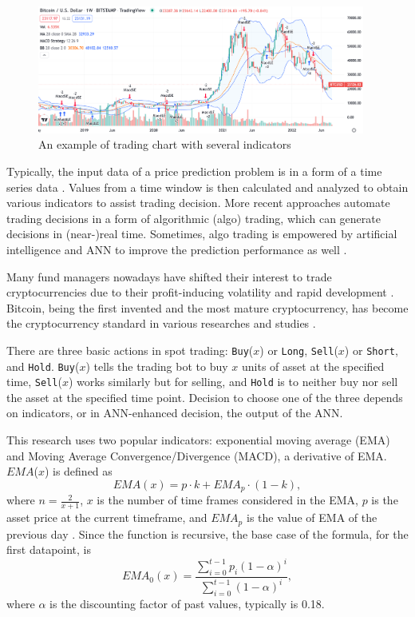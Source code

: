 \begin{figure}[h]
    \centering
    \includegraphics[width=0.96\textwidth]{graphics/3bitcoinindicators.png}
    \caption{An example of trading chart with several indicators \cite{X001}}
    \label{fig:3tv}
\end{figure}

Typically, the input data of a price prediction problem is in a form of a time series data \cite{AT51}. Values from a time window is then calculated and analyzed to obtain various indicators to assist trading decision. More recent approaches automate trading decisions in a form of algorithmic (algo) trading, which can generate decisions in (near-)real time. Sometimes, algo trading is empowered by artificial intelligence and ANN to improve the prediction performance as well \cite{AT49}.

Many fund managers nowadays have shifted their interest to trade cryptocurrencies due to their profit-inducing volatility \cite{AT72} and rapid development \cite{AT71}. Bitcoin, being the first invented and the most mature cryptocurrency, has become the cryptocurrency standard in various researches and studies \cite{AT72}.

There are three basic actions in spot trading: \texttt{Buy}($x$) or \texttt{Long}, \texttt{Sell}($x$) or \texttt{Short}, and \texttt{Hold}. \texttt{Buy}($x$) tells the trading bot to buy $x$ units of asset at the specified time, \texttt{Sell}($x$) works similarly but for selling, and \texttt{Hold} is to neither buy nor sell the asset at the specified time point. Decision to choose one of the three depends on indicators, or in ANN-enhanced decision, the output of the ANN.

This research uses two popular indicators: exponential moving average (EMA) and Moving Average Convergence/Divergence (MACD), a derivative of EMA. $EMA$($x$) is defined as
\[
	EMA(x) = p \cdot k + EMA_p \cdot (1 - k),
\] where $n = \frac{2}{x+1}$, $x$ is the number of time frames considered in the EMA, $p$ is the asset price at the current timeframe, and $EMA_p$ is the value of EMA of the previous day \cite{AT22}. Since the function is recursive, the base case of the formula, for the first datapoint, is \cite{AT23}
\[
	EMA_0(x) = \frac{\sum_{i=0}^{t - 1} p_i(1-\alpha)^i}{\sum_{i=0}^{t-1}(1-\alpha)^{i}},
\] where $\alpha$ is the discounting factor of past values, typically is 0.18.


